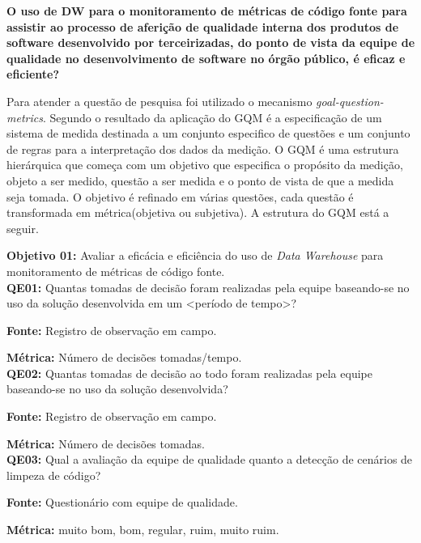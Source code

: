 \textbf{O uso de DW para o monitoramento de métricas de código fonte para assistir ao processo de aferição de qualidade interna dos produtos de software desenvolvido por terceirizadas, do ponto de vista da equipe de qualidade no desenvolvimento de software no órgão público, é eficaz e eficiente?}

Para atender a questão de pesquisa foi utilizado o mecanismo \textit{goal-question-metrics}. Segundo \cite{Basili96b} o resultado da aplicação do GQM é a especificação de um sistema de medida destinada a um conjunto especifico de questões e um conjunto de regras para a interpretação dos dados da medição. O GQM é uma estrutura hierárquica que começa com um objetivo que especifica o propósito da medição, objeto a ser medido, questão a ser medida e o ponto de vista de que a medida seja tomada. O objetivo é refinado em várias questões, cada questão é transformada em métrica(objetiva ou subjetiva)\cite{Basili96b}. A estrutura do GQM está a seguir.

\textbf{Objetivo 01:} Avaliar a eficácia e eficiência do uso de \textit{Data Warehouse} para monitoramento de métricas de código fonte.\\



\textbf{QE01:} Quantas tomadas de decisão foram realizadas pela equipe baseando-se no uso da solução desenvolvida em um <período de tempo>?

\textbf{Fonte:} Registro de observação em campo.

\textbf{Métrica:} Número de decisões tomadas/tempo. \\



\textbf{QE02: } Quantas tomadas de decisão ao todo foram realizadas pela equipe baseando-se no uso da solução desenvolvida?

\textbf{Fonte:} Registro de observação em campo.

\textbf{Métrica:} Número de decisões tomadas.\\



\textbf{QE03: } Qual a avaliação da equipe de qualidade quanto a detecção de cenários de limpeza de código?

\textbf{Fonte:} Questionário com equipe de qualidade.

\textbf{Métrica:} muito bom, bom, regular, ruim, muito ruim.\\




